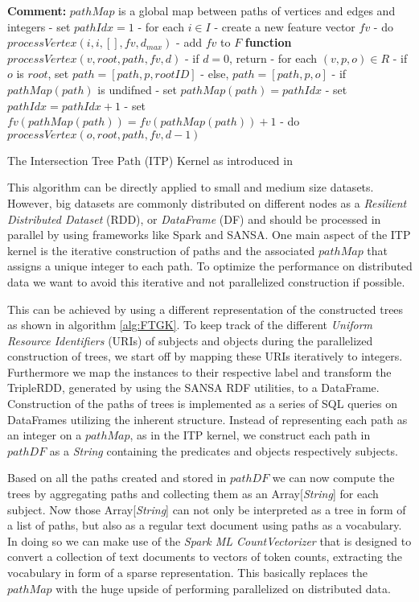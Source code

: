 \documentclass{easychair}
\begin{document}
\begin{algorithm}
 \label{alg:ITP}
 \textbf{Comment:} $pathMap$ is a global map between paths of vertices and edges and integers\;
 \;
 - set $pathIdx = 1$\;
 - for each $i \in I$\; \Indp
 - create a new feature vector $fv$\;
 - do $processVertex(i,i,[],fv,d_{max})$\;
 - add $fv$ to $F$\; \Indm
 \;
 \textbf{function} $processVertex(v,root,path,fv,d)$\; \Indp
 - if $d = 0$, return \;
 - for each $(v,p,o) \in R$\; \Indp
 - if $o$ is $root$, set $path = [path,p,rootID]$\;
 - else, $path = [path, p, o]$\;
 - if $pathMap(path)$ is undifned\; \Indp
 - set $pathMap(path) = pathIdx$
 - set$pathIdx = pathIdx + 1$\; \Indm
 - set $fv(pathMap(path)) = fv(pathMap(path)) + 1$\;
 - do $processVertex(o,root,path,fv,d-1)$\;
 \;
\caption{The Intersection Tree Path (ITP) Kernel as introduced in \cite{FGK}}
\end{algorithm}

This algorithm can be directly applied to small and medium size datasets. However, big datasets are commonly distributed on different nodes as a \textit{Resilient Distributed Dataset} (RDD), or \textit{DataFrame} (DF) \cite{RDDpaper} and should be processed in parallel by using frameworks like Spark and SANSA. One main aspect of the ITP kernel is the iterative construction of paths and the associated $pathMap$ that assigns a unique integer to each path. To optimize the performance on distributed data we want to avoid this iterative and not parallelized construction if possible.

This can be achieved by using a different representation of the constructed trees as shown in algorithm \ref{alg:FTGK}. To keep track of the different \textit{Uniform Resource Identifiers} (URIs) of subjects and objects during the parallelized construction of trees, we start off by mapping these URIs iteratively to integers. Furthermore we map the instances to their respective label and transform the TripleRDD, generated by using the SANSA RDF utilities, to a DataFrame. Construction of the paths of trees is implemented as a series of SQL queries on DataFrames utilizing the inherent structure. Instead of representing each path as an integer on a $pathMap$, as in the ITP kernel, we construct each path in $pathDF$ as a \textit{String} containing the predicates and objects respectively subjects.

Based on all the paths created and stored in $pathDF$ we can now compute the trees by aggregating paths and collecting them as an Array[\textit{String}] for each subject. Now those Array[\textit{String}] can not only be interpreted as a tree in form of a list of paths, but also as a regular text document using paths as a vocabulary.  In doing so we can make use of the \textit{Spark ML CountVectorizer} that is designed to convert a collection of text documents to vectors of token counts, extracting the vocabulary in form of a sparse representation. This basically replaces the $pathMap$ with the huge upside of performing parallelized on distributed data. 
\end{document}
